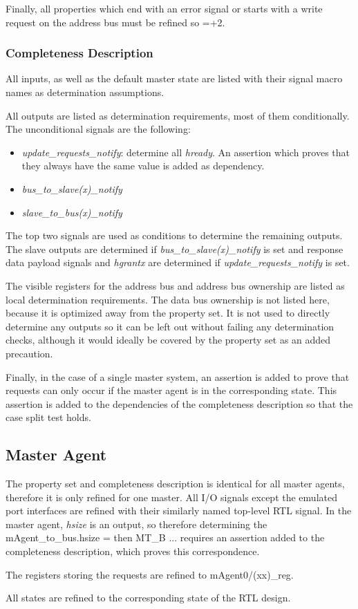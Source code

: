 Finally, all properties which end with an error signal or starts with a write request on the address bus must be refined so =+2.

\subsubsection{Completeness Description}
All inputs, as well as the default master state are listed with their signal macro names as determination assumptions. \par
All outputs are listed as determination requirements, most of them conditionally. The unconditional signals are the following: \\
\begin{itemize}
 \item \textit{update\_requests\_notify}: determine all \textit{hready}. An assertion which proves that they always have the same value is added as dependency.
 \item \textit{bus\_to\_slave(x)\_notify}
 \item \textit{slave\_to\_bus(x)\_notify} 
\end{itemize}

The top two signals are used as conditions to determine the remaining outputs. The slave outputs are determined if \textit{bus\_to\_slave(x)\_notify} is set and response data payload signals and \textit{hgrantx} are determined if \textit{update\_requests\_notify} is set. \par

The visible registers for the address bus and address bus ownership are listed as local determination requirements. The data bus ownership is not listed here, because it is optimized away from the property set. It is not used to directly determine any outputs so it can be left out without failing any determination checks, although it would ideally be covered by the property set as an added precaution. \par
Finally, in the case of a single master system, an assertion is added to prove that requests can only occur if the master agent is in the corresponding state. This assertion is added to the dependencies of the completeness description so that the case split test holds. 

\subsection{Master Agent}
The property set and completeness description is identical for all master agents, therefore it is only refined for one master. 
All I/O signals except the emulated port interfaces are refined with their similarly named top-level RTL signal. In the master agent, \textit{hsize} is an output, so therefore determining the \ITLRW{(}mAgent\_to\_bus.hsize =  then MT\_B ... requires an assertion added to the completeness description, which proves this correspondence. \par
The registers storing the requests are refined to mAgent0/(xx)\_reg. \par
All states are refined to the corresponding state of the RTL design.

